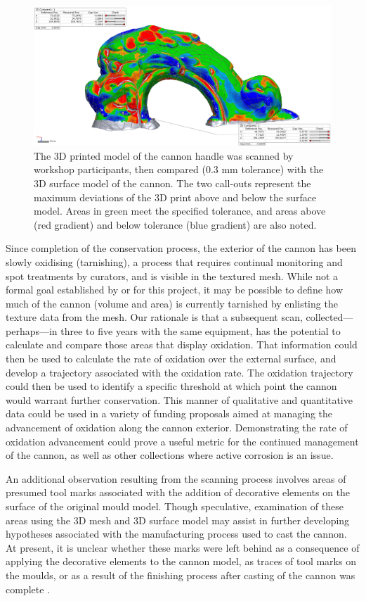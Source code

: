 \documentclass[review]{elsarticle}
\begin{document}
\begin{figure}[ht]\centering
\includegraphics[width=\linewidth]{CannonCompare}
\caption{The 3D printed model of the cannon handle was scanned by workshop participants, then compared (0.3 mm tolerance) with the 3D surface model of the cannon. The two call-outs represent the maximum deviations of the 3D print above and below the surface model. Areas in green meet the specified tolerance, and areas above (red gradient) and below tolerance (blue gradient) are also noted.}
\label{fig:Fig6}
\end{figure}

Since completion of the conservation process, the exterior of the cannon has been slowly oxidising (tarnishing), a process that requires continual monitoring and spot treatments by curators, and is visible in the textured mesh. While not a formal goal established by or for this project, it may be possible to define how much of the cannon (volume and area) is currently tarnished by enlisting the texture data from the mesh. Our rationale is that a subsequent scan, collected---perhaps---in three to five years with the same equipment, has the potential to calculate and compare those areas that display oxidation. That information could then be used to calculate the rate of oxidation over the external surface, and develop a trajectory associated with the oxidation rate. The oxidation trajectory could then be used to identify a specific threshold at which point the cannon would warrant further conservation. This manner of qualitative and quantitative data could be used in a variety of funding proposals aimed at managing the advancement of oxidation along the cannon exterior. Demonstrating the rate of oxidation advancement could prove a useful metric for the continued management of the cannon, as well as other collections where active corrosion is an issue.

An additional observation resulting from the scanning process involves areas of presumed tool marks associated with the addition of decorative elements on the surface of the original mould model. Though speculative, examination of these areas using the 3D mesh and 3D surface model may assist in further developing hypotheses associated with the manufacturing process used to cast the cannon. At present, it is unclear whether these marks were left behind as a consequence of applying the decorative elements to the cannon model, as traces of tool marks on the moulds, or as a result of the finishing process after casting of the cannon was complete \cite[358]{RN5763}.
\end{document}
